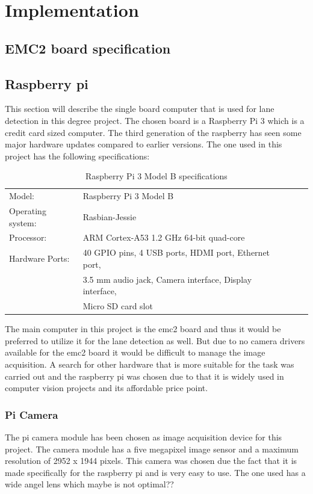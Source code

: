 \chapter{Implementation}

\section{EMC2 board specification}
\section{Raspberry pi}
This section will describe the single board computer that is used for lane detection in this degree project. The chosen board is a Raspberry Pi 3 which is a credit card sized computer. The third generation of the raspberry has seen some major hardware updates compared to earlier versions. The one used in this project has the following specifications:



\begin{table}[H]
\centering
\caption{Raspberry Pi 3 Model B specifications}
\label{my-label}
\begin{tabular}{lllll}
 Model:	&Raspberry Pi 3 Model B  \\
 Operating system:	&Rasbian-Jessie  \\
 Processor:	&ARM Cortex-A53 1.2 GHz 64-bit quad-core  \\
 Hardware Ports:	&40 GPIO pins, 4 USB ports, HDMI port, Ethernet port,\\  &3.5 mm audio jack, Camera interface, Display interface,\\  &Micro SD card slot
\end{tabular}
\end{table}



The main computer in this project is the emc2 board and thus it would be preferred to utilize it for the lane detection as well. But due to no camera drivers available for the emc2 board it would be difficult to manage the image acquisition. A search for other hardware that is more suitable for the task was carried out and the raspberry pi was chosen due to that it is widely used in computer vision projects and its affordable price point.

\subsection{Pi Camera}
The pi camera module has been chosen as image acquisition device for this project. The camera module has a five megapixel image sensor and a maximum resolution of 2952 x 1944 pixels. This camera was chosen due the fact that it is made specifically for the raspberry pi and is very easy to use. The one used has a wide angel lens which maybe is not optimal??




